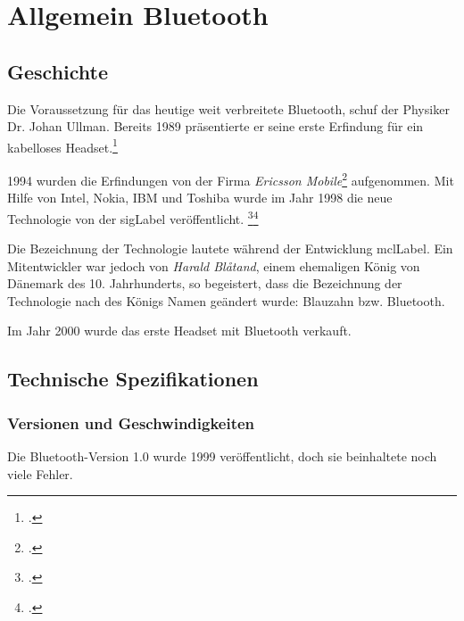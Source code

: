 \chapter{Allgemein Bluetooth}
\label{ch:general}

\section{Geschichte}
Die Voraussetzung für das heutige weit verbreitete Bluetooth, schuf der Physiker Dr. Johan Ullman.
Bereits 1989 präsentierte er seine erste Erfindung für ein kabelloses Headset.\footcite{Bluetooth_Wikipedia_2015-04-17}

1994 wurden die Erfindungen von der Firma \textit{Ericsson Mobile}\footcite{Ericsson_2015-04-17} aufgenommen.
Mit Hilfe von Intel, Nokia, IBM und Toshiba wurde im Jahr 1998 die neue Technologie von der \gls{sigLabel} veröffentlicht.
\footcite{Bluetooth_Special_Interest_Group_Wikipedia_2015-04-17}\footcite{The_history_of_Bluetooth_Ericsson_History_2015-04-17}

Die Bezeichnung der Technologie lautete während der Entwicklung \gls{mclLabel}.
Ein Mitentwickler war jedoch von \textit{Harald Bl{\aa}tand}, einem ehemaligen König von Dänemark des 10. Jahrhunderts, so begeistert, dass die Bezeichnung der Technologie nach des Königs Namen geändert wurde: Blauzahn bzw. Bluetooth.

Im Jahr 2000 wurde das erste Headset mit Bluetooth verkauft.

\section{Technische Spezifikationen}
\label{sec:general_specs}

\subsection{Versionen und Geschwindigkeiten}
\label{subsec:versions_speed}
Die Bluetooth-Version 1.0 wurde 1999 veröffentlicht, doch sie beinhaltete noch viele Fehler.

